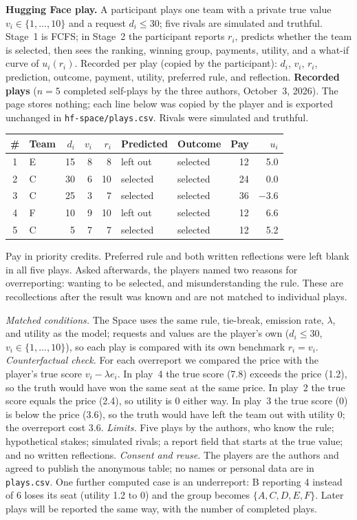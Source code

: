 \textbf{Hugging Face play.} A participant plays one team with a private true value $v_i\in\{1,\dots,10\}$ and a request $d_i\le30$; five rivals are simulated and truthful. Stage~1 is FCFS; in Stage~2 the participant reports $r_i$, predicts whether the team is selected, then sees the ranking, winning group, payments, utility, and a what-if curve of $u_i(r_i)$. Recorded per play (copied by the participant): $d_i$, $v_i$, $r_i$, prediction, outcome, payment, utility, preferred rule, and reflection. \textbf{Recorded plays} ($n=5$ completed self-plays by the three authors, October~3, 2026). The page stores nothing; each line below was copied by the player and is exported unchanged in \texttt{hf-space/plays.csv}. Rivals were simulated and truthful.

{\footnotesize\setlength{\tabcolsep}{3pt}
\begin{tabularx}{\columnwidth}{@{}clrrrYYrr@{}}\toprule
\# & Team & $d_i$ & $v_i$ & $r_i$ & Predicted & Outcome & Pay & $u_i$\\ & E & 15 & 8 & 8 & left out & selected & 12 & 5.0\\
2 & C & 30 & 6 & 10 & selected & selected & 24 & 0.0\\
3 & C & 25 & 3 & 7 & selected & selected & 36 & $-3.6$\\
4 & F & 10 & 9 & 10 & left out & selected & 12 & 6.6\\
5 & C & 5 & 7 & 7 & selected & selected & 12 & 5.2\\\bottomrule
\end{tabularx}}
{\footnotesize Pay in priority credits. Preferred rule and both written reflections were left blank in all five plays. Asked afterwards, the players named two reasons for overreporting: wanting to be selected, and misunderstanding the rule. These are recollections after the result was known and are not matched to individual plays.}

\emph{Matched conditions.} The Space uses the same rule, tie-break, emission rate, $\lambda$, and utility as the model; requests and values are the player's own ($d_i\le30$, $v_i\in\{1,\dots,10\}$), so each play is compared with its own benchmark $r_i=v_i$. \emph{Counterfactual check.} For each overreport we compared the price with the player's true score $v_i-\lambda e_i$. In play~4 the true score (7.8) exceeds the price (1.2), so the truth would have won the same seat at the same price. In play~2 the true score equals the price (2.4), so utility is 0 either way. In play~3 the true score (0) is below the price (3.6), so the truth would have left the team out with utility 0; the overreport cost 3.6. \emph{Limits.} Five plays by the authors, who know the rule; hypothetical stakes; simulated rivals; a report field that starts at the true value; and no written reflections. \emph{Consent and reuse.} The players are the authors and agreed to publish the anonymous table; no names or personal data are in \texttt{plays.csv}. One further computed case is an underreport: B reporting 4 instead of 6 loses its seat (utility 1.2 to 0) and the group becomes $\{A,C,D,E,F\}$. Later plays will be reported the same way, with the number of completed plays.

